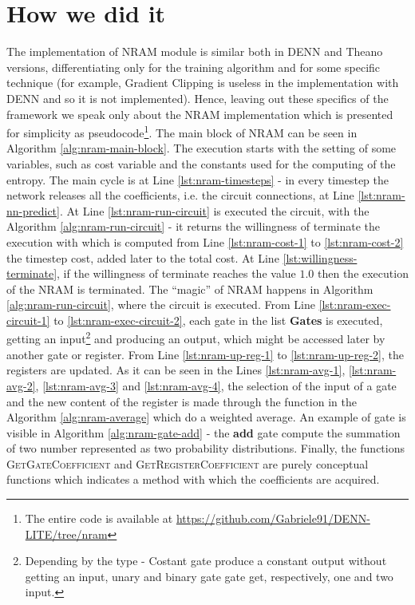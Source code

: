 \section{How we did it}
The implementation of NRAM module is similar both in DENN and Theano versions, differentiating only for the training algorithm and for some specific technique (for example, Gradient Clipping is useless in the implementation with DENN and so it is not implemented). Hence, leaving out these specifics of the framework we speak only about the NRAM implementation which is presented for simplicity as pseudocode\footnote{The entire code is available at \href{https://github.com/Gabriele91/DENN-LITE/tree/nram}{https://github.com/Gabriele91/DENN-LITE/tree/nram}}.\newline
The main block of NRAM can be seen in Algorithm \ref{alg:nram-main-block}. The execution starts with the setting of some variables, such as cost variable and the constants used for the computing of the entropy. The main cycle is at Line \ref{lst:nram-timesteps} - in every timestep the network releases all the coefficients, i.e. the circuit connections, at Line \ref{lst:nram-nn-predict}. At Line \ref{lst:nram-run-circuit} is executed the circuit, with the Algorithm \ref{alg:nram-run-circuit} - it returns the willingness of terminate the execution with which is computed from Line \ref{lst:nram-cost-1} to \ref{lst:nram-cost-2} the timestep cost, added later to the total cost. At Line \ref{lst:willingness-terminate}, if the willingness of terminate reaches the value $1.0$ then the execution of the NRAM is terminated. The ``magic'' of NRAM happens in Algorithm \ref{alg:nram-run-circuit}, where the circuit is executed. From Line \ref{lst:nram-exec-circuit-1} to \ref{lst:nram-exec-circuit-2}, each gate in the list \textbf{Gates} is executed, getting an input\footnote{Depending by the type - Costant gate produce a constant output without getting an input, unary and binary gate gate get, respectively, one and two input.} and producing an output, which might be accessed later by another gate or register. From Line \ref{lst:nram-up-reg-1} to \ref{lst:nram-up-reg-2}, the registers are updated. As it can be seen in the Lines \ref{lst:nram-avg-1}, \ref{lst:nram-avg-2}, \ref{lst:nram-avg-3} and \ref{lst:nram-avg-4}, the selection of the input of a gate and the new content of the register is made through the function in the Algorithm \ref{alg:nram-average} which do a weighted average. An example of gate is visible in Algorithm \ref{alg:nram-gate-add} - the \textbf{add} gate compute the summation of two number represented as two probability distributions. Finally, the functions \textsc{GetGateCoefficient} and \textsc{GetRegisterCoefficient} are purely conceptual functions which indicates a method with which the coefficients are acquired.

